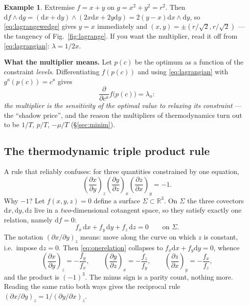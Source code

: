 \documentclass[10pt,a4paper]{article}
\newcommand{\dd}{\mathrm{d}}
\newcommand{\R}{\mathbb{R}}
\newcommand{\pd}[2]{\frac{\partial #1}{\partial #2}}
\theoremstyle{plain}
\theoremstyle{definition}
\newtheorem{ex}[thm]{Example}
\numberwithin{equation}{section}
\begin{document}
\begin{ex}
Extremise $f=x+y$ on $g=x^2+y^2=r^2$. Then $\dd f\wedge\dd g=(\dd x+\dd y)\wedge(2x\dd x+2y\dd y)
=2(y-x)\dd x\wedge\dd y$, so \eqref{eq:lagrangewedge} gives $y=x$ immediately and
$(x,y)=\pm(r/\sqrt2,r/\sqrt2)$ --- the tangency of Fig.~\ref{fig:lagrange}. If you want the
multiplier, read it off from \eqref{eq:lagrangian}: $\lambda=1/2x$.
\end{ex}

\noindent\textbf{What the multiplier means.} Let $p(c)$ be the optimum as a function of the
constraint \emph{levels}. Differentiating $f(p(c))$ and using \eqref{eq:lagrangian} with
$g^a(p(c))=c^a$ gives
\begin{equation}
\pd{}{c^a}f\big(p(c)\big)=\lambda_a :
\label{eq:envelope}
\end{equation}
\emph{the multiplier is the sensitivity of the optimal value to relaxing its constraint} --- the
``shadow price'', and the reason the multipliers of thermodynamics turn out to be $1/T$, $p/T$,
$-\mu/T$ (\S\ref{sec:minim}).

\subsection{The thermodynamic triple product rule}
\label{sec:triple}

A rule that reliably confuses: for three quantities constrained by one equation,
\begin{equation}
\left(\pd{x}{y}\right)_{\!z}\left(\pd{y}{z}\right)_{\!x}\left(\pd{z}{x}\right)_{\!y}=-1 .
\label{eq:triple}
\end{equation}
Why $-1$? Let $f(x,y,z)=0$ define a surface $\Sigma\subset\R^3$. On $\Sigma$ the three covectors
$\dd x,\dd y,\dd z$ live in a \emph{two}-dimensional cotangent space, so they satisfy exactly
one relation, namely $\dd f=0$:
\begin{equation}
f_x\,\dd x+f_y\,\dd y+f_z\,\dd z=0\qquad\text{on }\Sigma .
\label{eq:onerelation}
\end{equation}
The notation $(\partial x/\partial y)_z$ means: move along the curve on which $z$ is constant,
i.e.\ impose $\dd z=0$. Then \eqref{eq:onerelation} collapses to $f_x\dd x+f_y\dd y=0$, whence
\begin{equation}
\left(\pd{x}{y}\right)_{\!z}=-\frac{f_y}{f_x},\qquad
\left(\pd{y}{z}\right)_{\!x}=-\frac{f_z}{f_y},\qquad
\left(\pd{z}{x}\right)_{\!y}=-\frac{f_x}{f_z},
\end{equation}
and the product is $(-1)^3$. The minus sign is a parity count, nothing more. Reading the same
ratio both ways gives the reciprocal rule $(\partial x/\partial y)_z=1/(\partial y/\partial x)_z$.
\end{document}
